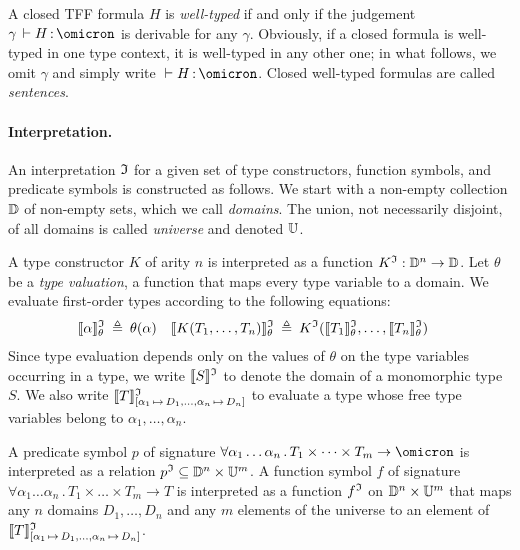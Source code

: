 A closed TFF formula $H$ is {\em well-typed\/} if and only if
the judgement $\gamma\, \vdash H \ty \omicron$ is derivable
for any $\gamma$.
Obviously, if a closed formula is
well-typed in one type context, it is well-typed in any other one;
in what follows, we omit $\gamma$ and simply write
${} \vdash H \ty \omicron$.
Closed well-typed formulas are called {\em sentences}.

\paragraph{Interpretation.}
An interpretation $\mathfrak{I}$ for a given set of type constructors,
function symbols, and predicate symbols is constructed as follows.
We start with a non-empty collection $\mathbb{D}$ of non-empty sets,
which we call {\em domains}. The union, not necessarily disjoint,
of all domains is called {\em universe\/} and denoted $\mathbb{U}$.

A type constructor $K$ of arity $n$ is interpreted as a function
$K^{\mathfrak{I}} : \mathbb{D}^n \to \mathbb{D}$.
Let $\theta$ be a {\em type valuation}, a function that maps every
type variable to a domain. We evaluate first-order types according
to the following equations:
\begin{align*}
\llbracket\alpha\rrbracket^{\mathfrak{I}}_{\theta} &\:\triangleq\: \theta(\alpha) &
\llbracket K(T_1,\dots,T_n)\rrbracket^{\mathfrak{I}}_{\theta} &\:\triangleq\: K^{\mathfrak{I}}(\llbracket T_1\rrbracket^{\mathfrak{I}}_{\theta},\dots,\llbracket T_n\rrbracket^{\mathfrak{I}}_{\theta})
\end{align*}
Since type evaluation depends only on the values of $\theta$
on the type variables occurring in a type, we write $\llbracket S\rrbracket^{\mathfrak{I}}$
to denote the domain of a monomorphic type $S$. We also write
$\llbracket T\rrbracket^{\mathfrak{I}}_{[\alpha_1\,\mapsto\,D_1,\dots,\alpha_n\,\mapsto\,D_n]}$
to evaluate a type whose free type variables
belong to $\alpha_1,\dots,\alpha_n$.

A predicate symbol $p$ of signature
$\forall \alpha_1\dots\alpha_n \,.\, T_1 \times \dots \times T_m
\to \omicron$ is interpreted as a relation
$p^{\mathfrak{I}} \subseteq \mathbb{D}^n \times \mathbb{U}^m$.
A function symbol $f$ of signature
$\forall \alpha_1\dots\alpha_n \,.\, T_1 \times \dots \times T_m \to T$
is interpreted as a function
$f^{\mathfrak{I}}$ on $\mathbb{D}^n \times \mathbb{U}^m$ that
maps any $n$ domains $D_1,\dots,D_n$ and
any $m$ elements of the universe
to an element of
$\llbracket T\rrbracket^{\mathfrak{I}}_{[\alpha_1\,\mapsto\,D_1,\dots,\alpha_n\,\mapsto\,D_n]}$.

